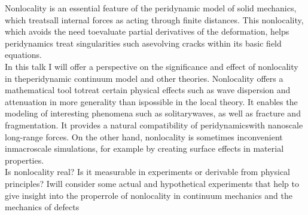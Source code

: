Nonlocality is an essential feature of the peridynamic model of solid mechanics, which treatsall internal forces as acting through finite distances.  This nonlocality, which avoids the need toevaluate partial derivatives of the deformation,  helps peridynamics treat singularities such asevolving cracks within its basic field equations.\\

In  this  talk  I  will  offer  a  perspective  on  the  significance  and  effect  of  nonlocality  in  theperidynamic  continuum  model  and  other  theories.   Nonlocality  offers  a  mathematical  tool  totreat certain physical effects such as wave dispersion and attenuation in more generality than ispossible in the local theory.  It enables the modeling of interesting phenomena such as solitarywaves, as well as fracture and fragmentation.  It provides a natural compatibility of peridynamicswith nanoscale long-range forces.  On the other hand, nonlocality is sometimes inconvenient inmacroscale simulations, for example by creating surface effects in material properties.\\

Is nonlocality real?  Is it measurable in experiments or derivable from physical principles?  Iwill consider some actual and hypothetical experiments that help to give insight into the properrole of nonlocality in continuum mechanics and the mechanics of defects